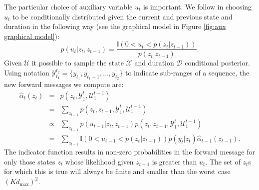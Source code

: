 
The particular choice of auxiliary variable $u_t$ is important.  We follow  \cite{vanGael2008} in choosing $u_t$ to be conditionally distributed given the current and previous state and duration in the following way (see the graphical model in Figure \ref{fig:aux graphical model}):
\begin{equation}
    \label{eqn:slice}
    p(u_t | z_t, z_{t-1}) = 
    \frac
    {\mathbb{I}(0 < u_t < p(z_t | z_{t-1}))} 
    {p(z_t | z_{t-1})}.
\end{equation}
Given $\mathcal{U}$ it possible to sample the state $\mathcal{X}$ and duration $\mathcal{D}$ conditional posterior. 
Using notation $\mathcal{Y}_{t_1}^{t_2} = \{y_{t_1}, y_{t_1+1}, \ldots,y_{t_2}\}$  to indicate sub-ranges of a sequence, the new forward messages we compute are:
\begin{eqnarray}
   \hat{\alpha}_t(z_t) &=& 
   p(z_t, \mathcal{Y}_1^t , \mathcal{U}_1^{t-1})   \label{eqn:scaled forward} \\
   &=& 
   \sum_{z_{t-1}}
   p(z_t, z_{t-1} , \mathcal{Y}_1^t , \mathcal{U}_1^{t-1}) \nonumber \\
   &\propto& 
   \sum_{z_{t-1}}
   p(u_{t-1} | z_t, z_{t-1})
   p(z_t, z_{t-1} , \mathcal{Y}_1^t, \mathcal{U}_1^{t-1}) \nonumber \\
   &=& 
   \sum_{z_{t-1}}
   \mathbb{I}(0 < u_{t-1} < p(z_t | z_{t-1}))
   p(y_t|z_t) \hat{\alpha}_{t-1}(z_{t-1}) \nonumber.
\end{eqnarray}
The indicator function results in non-zero probabilities in the forward message for only those states $z_t$ whose likelihood given $z_{t-1}$ is greater than $u_t$. The set of $z_t$s for which this is true will always be finite and smaller than the worst case $(Kd_\mathrm{max})^2$. 
